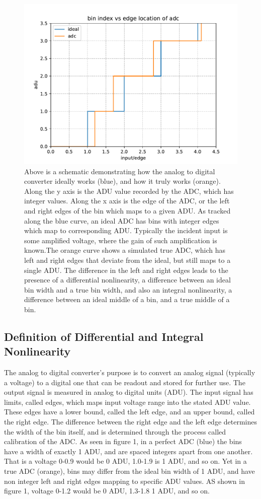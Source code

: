 \documentclass[11pt, letterpaper]{article}
\begin{document}
\begin{figure}
    \centering
    \includegraphics[width=0.5\linewidth]{dnlinlex.pdf}
    \caption{Above is a schematic demonstrating how the analog to digital converter ideally works (blue), and how it truly works (orange). Along the y axis is the ADU value recorded by the ADC, which has integer values. Along the x axis is the edge of the ADC, or the left and right edges of the bin which maps to a given ADU. As tracked along the blue curve, an ideal ADC has bins with integer edges which map to corresponding ADU. Typically the incident input is some amplified voltage, where the gain of such amplification is known.The orange curve shows a simulated true ADC, which has left and right edges that deviate from the ideal, but still maps to a single ADU. The difference in the left and right edges leads to the presence of a differential nonlinearity, a difference between an ideal bin width and a true bin width, and also an integral nonlinearity, a difference between an ideal middle of a bin, and a true middle of a bin.}
    \label{fig:enter-label}
\end{figure}

\subsection{Definition of Differential and Integral Nonlinearity}
\indent 


The analog to digital converter’s purpose is to convert an analog signal (typically a voltage) to a digital one that can be readout and stored for further use. 
The output signal is measured in analog to digital units (ADU). 
The input signal has limits, called edges, which maps input voltage range into the stated ADU value. 
These edges have a lower bound, called the left edge, and an upper bound, called the right edge.
The difference between the right edge and the left edge determines the width of the bin itself, and is determined through the process called calibration of the ADC. 
As seen in figure 1, in a perfect ADC (blue) the bins have a width of exactly 1 ADU, and are spaced integers apart from one another. 
That is a voltage 0-0.9 would be 0 ADU, 1.0-1.9 is 1 ADU, and so on. 
Yet in a true ADC (orange), bins may differ from the ideal bin width of 1 ADU, and have non integer left and right edges mapping to specific ADU values. 
AS shown in figure 1, voltage 0-1.2 would be 0 ADU, 1.3-1.8 1 ADU, and so on. 
\indent 
\end{document}
